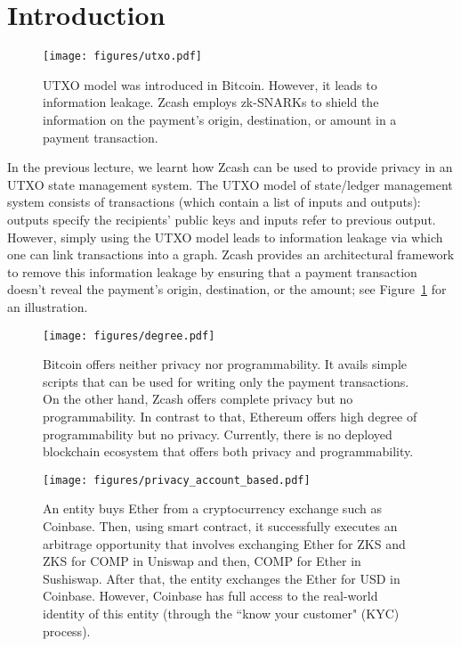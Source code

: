 \documentclass{article}
\begin{document}
\section*{Introduction}
\begin{figure}[h]
    \centering
    \texttt{[image: figures/utxo.pdf]}
    \caption{UTXO model was introduced in Bitcoin. However, it leads to information leakage. Zcash employs zk-SNARKs to shield the information on the payment's origin, destination, or amount in a payment transaction.}
    \label{fig:utxo-zcash}
\end{figure}
In the previous lecture, we learnt how Zcash can be used to provide privacy in an UTXO state management system. The UTXO model of state/ledger management system consists of  transactions (which contain a list of inputs and outputs):  outputs specify the recipients' public keys and inputs refer to previous output. However, simply using the UTXO model leads to information leakage via which one can link transactions into a graph. Zcash provides an architectural framework to remove this information leakage by ensuring that a payment transaction doesn't reveal the payment's origin, destination, or the amount; see Figure~\ref{fig:utxo-zcash} for an illustration. 
\begin{figure}
    \centering
    \texttt{[image: figures/degree.pdf]}
    \caption{Bitcoin offers neither privacy nor programmability. It avails simple scripts that can be used for writing only the payment transactions. On the other hand, Zcash offers complete privacy but no programmability. In contrast to that, Ethereum offers high degree of programmability but no privacy. Currently, there is no deployed blockchain ecosystem that offers both privacy and programmability.}
    \label{fig:degree}
\end{figure}
\begin{figure}
    \centering
    \texttt{[image: figures/privacy\_account\_based.pdf]}
    \caption{An entity buys Ether from a cryptocurrency exchange such as Coinbase. Then, using smart contract, it successfully executes an arbitrage opportunity that involves exchanging Ether for ZKS and ZKS for COMP in Uniswap and then, COMP for Ether in Sushiswap. After that, the entity exchanges the Ether for USD in Coinbase. However, Coinbase has full access to the real-world identity of this entity (through the ``know your customer" (KYC) process). }
    \label{fig:user-privacy-account-based}
\end{figure}
\end{document}
